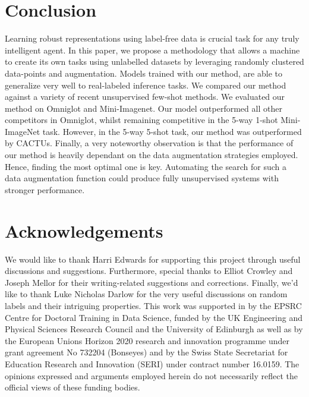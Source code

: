 \documentclass{article}
\begin{document}
\section{Conclusion}
Learning robust representations using label-free data is crucial task for any truly intelligent agent. In this paper, we propose a methodology that allows a machine to create its own tasks using unlabelled datasets by leveraging randomly clustered data-points and augmentation. Models trained with our method, are able to generalize very well to real-labeled inference tasks. 
We compared our method against a variety of recent unsupervised few-shot methods. We evaluated our method on Omniglot and Mini-Imagenet. Our model outperformed all other competitors in Omniglot, whilst remaining competitive in the 5-way 1-shot Mini-ImageNet task. However, in the 5-way 5-shot task, our method was outperformed by CACTUs. Finally, a very noteworthy observation is that the performance of our method is heavily dependant on the data augmentation strategies employed. Hence, finding the most optimal one is key. Automating the search for such a data augmentation function could produce fully unsupervised systems with stronger performance.


\section{Acknowledgements}
We would like to thank Harri Edwards for supporting this project through useful discussions and suggestions. Furthermore, special thanks to Elliot Crowley and Joseph Mellor for their writing-related suggestions and corrections. Finally, we'd like to thank Luke Nicholas Darlow for the very useful discussions on random labels and their intriguing properties. This work was supported in by the EPSRC Centre for Doctoral Training in Data Science, funded by the UK Engineering and Physical
Sciences Research Council and the University of Edinburgh as well as by the European Unions Horizon 2020 research and innovation programme under grant agreement No 732204 (Bonseyes) and by the Swiss State Secretariat for Education Research and Innovation (SERI) under contract number 16.0159. The opinions expressed and arguments employed herein do not necessarily reflect the official views of these funding bodies.



\end{document}
